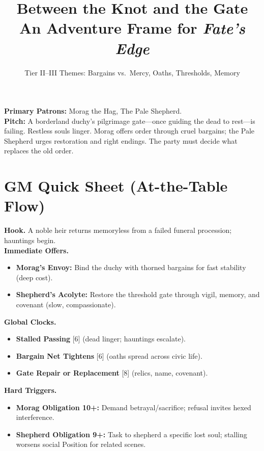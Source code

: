 \documentclass[11pt]{article}
\title{\vspace{-1.5em}\textbf{Between the Knot and the Gate}\\
\large An Adventure Frame for \textit{Fate's Edge}}
\author{Tier II--III \quad Themes: Bargains vs.\ Mercy, Oaths, Thresholds, Memory}
\date{}
\newcommand{\clock}[1]{\textsc{[#1]}}
\begin{document}
\maketitle
\vspace{-1.25em}

\noindent\textbf{Primary Patrons:} Morag the Hag, The Pale Shepherd.\\
\textbf{Pitch:} A borderland duchy's pilgrimage gate---once guiding the dead to rest---is failing. Restless souls linger. Morag offers order through cruel bargains; the Pale Shepherd urges restoration and right endings. The party must decide what replaces the old order.

\section*{GM Quick Sheet (At-the-Table Flow)}
\textbf{Hook.} A noble heir returns memoryless from a failed funeral procession; hauntings begin.\\
\textbf{Immediate Offers.}
\begin{itemize}
  \item \textbf{Morag's Envoy:} Bind the duchy with thorned bargains for fast stability (deep cost).
  \item \textbf{Shepherd's Acolyte:} Restore the threshold gate through vigil, memory, and covenant (slow, compassionate).
\end{itemize}
\textbf{Global Clocks.}
\begin{itemize}
  \item \textbf{Stalled Passing} \clock{6} (dead linger; hauntings escalate).
  \item \textbf{Bargain Net Tightens} \clock{6} (oaths spread across civic life).
  \item \textbf{Gate Repair or Replacement} \clock{8} (relics, name, covenant).
\end{itemize}
\textbf{Hard Triggers.}
\begin{itemize}
  \item \textbf{Morag Obligation 10+:} Demand betrayal/sacrifice; refusal invites hexed interference.
  \item \textbf{Shepherd Obligation 9+:} Task to shepherd a specific lost soul; stalling worsens social Position for related scenes.
\end{itemize}
\end{document}
